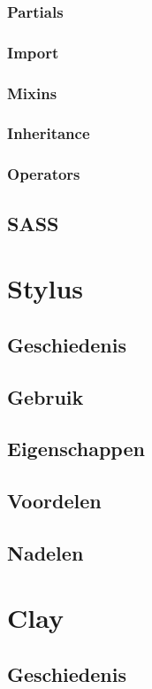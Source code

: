 \documentclass[pdftex,a4paper,12pt,twoside]{report}
\begin{document}
\subsubsection{Partials}
\subsubsection{Import}
\subsubsection{Mixins}
\subsubsection{Inheritance}
\subsubsection{Operators}


\subsection{SASS}

\section{Stylus}
\subsection{Geschiedenis}
\subsection{Gebruik}
\subsection{Eigenschappen}
\subsection{Voordelen}
\subsection{Nadelen}



\section{Clay}
\subsection{Geschiedenis}
\end{document}

